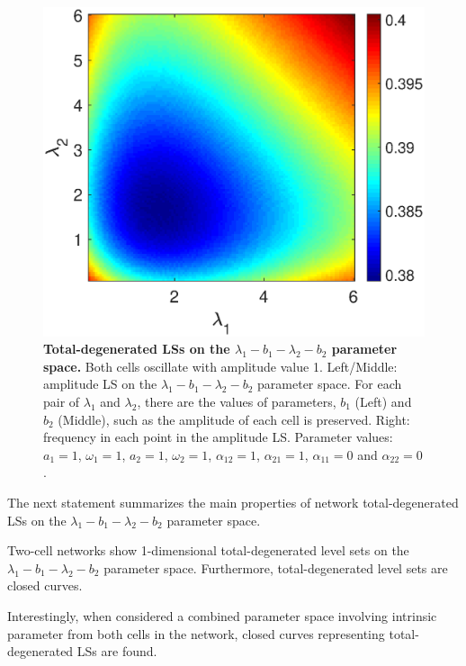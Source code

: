 \begin{figure}[h]
\begin{minipage}{0.32\linewidth}
  \end{minipage} 
   \begin{minipage}{0.32\linewidth}
  \begin{center}
\includegraphics[width=1\linewidth]{Images/photo28_3.eps}
\end{center}

  \end{minipage} 
  
  \caption{\textbf{Total-degenerated LSs on the $\lambda_{1}-b_{1}-\lambda_{2}-b_{2}$ parameter space.} Both cells oscillate with amplitude value 1. Left/Middle: amplitude LS on the $\lambda_{1}-b_{1}-\lambda_{2}-b_{2}$ parameter space. For each pair of $\lambda_{1}$ and $\lambda_{2}$, there are the values of parameters, $b_{1}$ (Left) and $b_{2}$ (Middle), such as the amplitude of each cell is preserved. Right: frequency in each point in the amplitude LS. Parameter values: $a_{1} = 1$, $\omega_{1} = 1$, $a_{2} = 1$, $\omega_{2} = 1$, $\alpha_{12} = 1$, $\alpha_{21} = 1$, $\alpha_{11} = 0$ and $\alpha_{22} = 0$.}
  \label{photo28}
\end{figure}

The next statement summarizes the main properties of network total-degenerated LSs on the $\lambda_{1}-b_{1}-\lambda_{2}-b_{2}$ parameter space.

\begin{Statement}
Two-cell networks show 1-dimensional total-degenerated level sets on the $\lambda_{1}-b_{1}-\lambda_{2}-b_{2}$ parameter space. Furthermore, total-degenerated level sets are closed curves.
\end{Statement}

Interestingly, when considered a combined parameter space involving intrinsic parameter from both cells in the network, closed curves representing total-degenerated LSs are found.